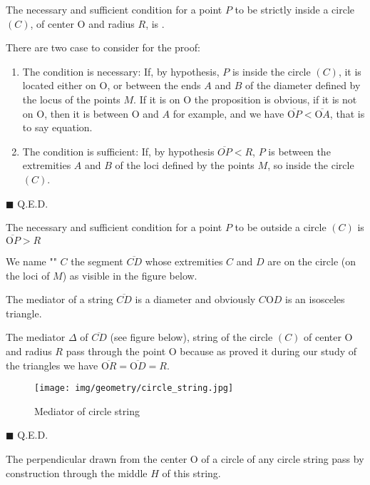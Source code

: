 	\begin{theorem}
	The necessary and sufficient condition for a point $P$ to be strictly inside a circle $(C)$, of center O and radius $R$, is .
	\end{theorem}
	\begin{dem}
	There are two case to consider for the proof:
	\begin{enumerate}
		\item The condition is necessary: If, by hypothesis, $P$ is inside the circle $(C)$, it is located either on O, or between the ends $A$ and $B$ of the diameter defined by the locus of the points $M$. If it is on O the proposition is obvious, if it is not on O, then it is between O and $A$ for example, and we have $\overline{\text{O}P}<\overline{\text{O}A}$, that is to say equation.

		\item The condition is sufficient: If, by hypothesis $\overline{OP}<R$, $P$ is between the extremities $A$ and $B$ of the loci defined by the points $M$, so inside the circle $(C)$.
	\end{enumerate}
	\begin{flushright}
		$\blacksquare$  Q.E.D.
	\end{flushright}
	\end{dem}
	\begin{corollary}
	The necessary and sufficient condition for a point $P$ to be outside a circle $(C)$ is $\overline{\text{O}P}>R$
	\end{corollary}
	
	We name "" $C$ the segment  $\overline{CD}$ whose extremities $C$ and $D$ are on the circle (on the loci of $M$) as visible in the figure below.

	\begin{theorem}
	The mediator of a string $\overline{CD}$ is a diameter and obviously $C\text{O}D$ is an isosceles triangle.
	\end{theorem}
	\begin{dem}
	The mediator $\Delta$ of $\overline{CD}$ (see figure below), string of the circle $(C)$ of center O and radius $R$ pass through the point O because as proved it during our study of the triangles we have $\overline{\text{O}R}=\overline{\text{O}D}=R$.
	\begin{figure}[H]
		\centering
		\texttt{[image: img/geometry/circle\_string.jpg]}
		\caption[]{Mediator of circle string}
	\end{figure}
	\begin{flushright}
		$\blacksquare$  Q.E.D.
	\end{flushright}
	\end{dem}
	\begin{corollary}
	The perpendicular drawn from the center O of a circle of any circle string pass by construction through the middle $H$ of this string.
	\end{corollary}
	

